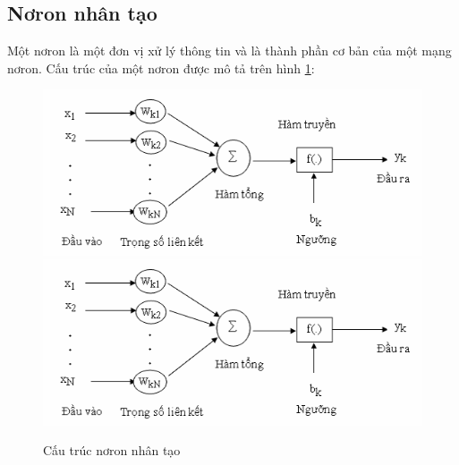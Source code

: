 \subsection{Nơron nhân tạo}
Một nơron là một đơn vị xử lý thông tin và là thành phần cơ bản của một mạng nơron. Cấu trúc của một nơron được mô tả trên hình \ref{neuralnhantao}: 
\begin{figure}[!htbp] 
  \begin{center}
    \ifpdf
      \includegraphics[scale=1.0]{Appendix1/nerualnhantao}
    \else
      \includegraphics[scale=1.0]{Appendix1/nerualnhantao}
    \fi
    \caption{Cấu trúc nơron nhân tạo}
    \label{neuralnhantao}
  \end{center}
\end{figure}

